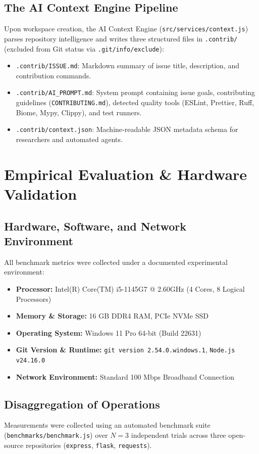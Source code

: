\documentclass[10pt,conference]{IEEEtran}
\begin{document}
\subsection{The AI Context Engine Pipeline}
Upon workspace creation, the AI Context Engine (\texttt{src/services/context.js}) parses repository intelligence and writes three structured files in \texttt{.contrib/} (excluded from Git status via \texttt{.git/info/exclude}):
\begin{itemize}
    \item \texttt{.contrib/ISSUE.md}: Markdown summary of issue title, description, and contribution commands.
    \item \texttt{.contrib/AI\_PROMPT.md}: System prompt containing issue goals, contributing guidelines (\texttt{CONTRIBUTING.md}), detected quality tools (ESLint, Prettier, Ruff, Biome, Mypy, Clippy), and test runners.
    \item \texttt{.contrib/context.json}: Machine-readable JSON metadata schema for researchers and automated agents.
\end{itemize}

\section{Empirical Evaluation \& Hardware Validation}

\subsection{Hardware, Software, and Network Environment}
All benchmark metrics were collected under a documented experimental environment:
\begin{itemize}
    \item \textbf{Processor:} Intel(R) Core(TM) i5-1145G7 @ 2.60GHz (4 Cores, 8 Logical Processors)
    \item \textbf{Memory \& Storage:} 16 GB DDR4 RAM, PCIe NVMe SSD
    \item \textbf{Operating System:} Windows 11 Pro 64-bit (Build 22631)
    \item \textbf{Git Version \& Runtime:} \texttt{git version 2.54.0.windows.1}, \texttt{Node.js v24.16.0}
    \item \textbf{Network Environment:} Standard 100 Mbps Broadband Connection
\end{itemize}

\subsection{Disaggregation of Operations}
Measurements were collected using an automated benchmark suite (\texttt{benchmarks/benchmark.js}) over $N=3$ independent trials across three open-source repositories (\texttt{express}, \texttt{flask}, \texttt{requests}).
\end{document}
